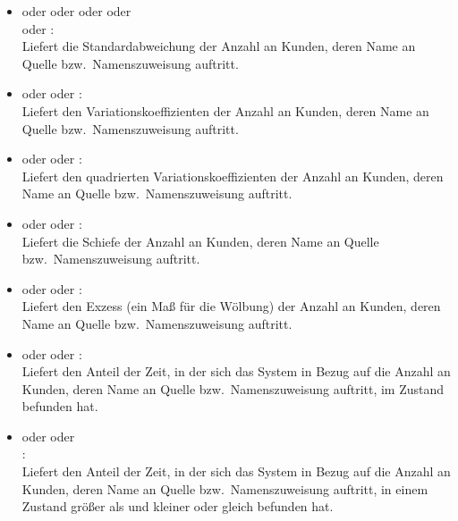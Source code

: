 \begin{itemize}
\item
{} oder  oder  oder  oder\\
 oder :\\
Liefert die Standardabweichung der Anzahl an Kunden, deren Name an Quelle bzw.\ Namenszuweisung  auftritt.

\item
{} oder  oder :\\
Liefert den Variationskoeffizienten der Anzahl an Kunden, deren Name an Quelle bzw.\ Namenszuweisung  auftritt.

\item
{} oder  oder :\\
Liefert den quadrierten Variationskoeffizienten der Anzahl an Kunden, deren Name an Quelle bzw.\ Namenszuweisung  auftritt.

\item
{} oder  oder :\\
Liefert die Schiefe der Anzahl an Kunden, deren Name an Quelle bzw.\ Namenszuweisung  auftritt.

\item
{} oder  oder :\\
Liefert den Exzess (ein Maß für die Wölbung) der Anzahl an Kunden, deren Name an Quelle bzw.\ Namenszuweisung  auftritt.

\item
{} oder  oder :\\
Liefert den Anteil der Zeit, in der sich das System in Bezug auf die Anzahl an Kunden, deren Name an Quelle bzw.\ Namenszuweisung  auftritt, im Zustand  befunden hat.

\item
{} oder  oder\\
:\\
Liefert den Anteil der Zeit, in der sich das System in Bezug auf die Anzahl an Kunden, deren Name an Quelle bzw.\ Namenszuweisung  auftritt, in einem Zustand größer als  und kleiner oder gleich  befunden hat.

\end{itemize}



